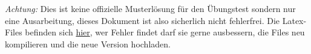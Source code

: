 \documentclass[crop=false]{standalone}
\begin{document}
\begin{disclaimer}
\emph{Achtung:} Dies ist keine offizielle Musterlösung für den Übungstest sondern nur eine Ausarbeitung, dieses Dokument ist also sicherlich nicht fehlerfrei. Die Latex-Files befinden sich \href{https://github.com/FritzMichael/AUT1_UE_2016_Klausur2}{hier}, wer Fehler findet darf sie gerne ausbessern, die Files neu kompilieren und die neue Version hochladen.
\end{disclaimer}
\end{document}
